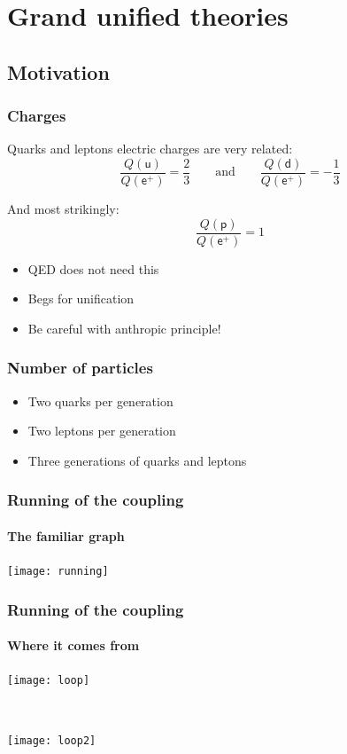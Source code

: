 \documentclass[english, fleqn]{beamer}
\newcommand\qqandqq{\qquad\text{and}\qquad}
\begin{document}
\section{Grand unified theories}

\subsection{Motivation}

\begin{frame}
    \frametitle{Charges}

    Quarks and leptons electric charges are very related:
    \[
        \frac{Q(\mathsf u)}{Q(\mathsf e^+)} = \frac 23
        \qqandqq
        \frac{Q(\mathsf d)}{Q(\mathsf e^+)} = - \frac 13
    \]

    \pause

    And most strikingly:
    \[
        \frac{Q(\mathsf p)}{Q(\mathsf e^+)} = 1
    \]

    \pause

    \begin{itemize}
        \item QED does not need this
        \item Begs for unification
        \item Be careful with anthropic principle!
    \end{itemize}
\end{frame}

\begin{frame}
    \frametitle{Number of particles}

    \begin{itemize}
        \item Two quarks per generation
        \item Two leptons per generation
        \item Three generations of quarks and leptons
    \end{itemize}
\end{frame}

\begin{frame}
    \frametitle{Running of the coupling}
    \framesubtitle{The familiar graph}

    {
        \centering
        \texttt{[image: running]}
    }

    \parencite{Peskin/1997ez}
\end{frame}

\begin{frame}
    \frametitle{Running of the coupling}
    \framesubtitle{Where it comes from}

    \texttt{[image: loop]} 

    \

    \texttt{[image: loop2]} 
\end{frame}
\end{document}
